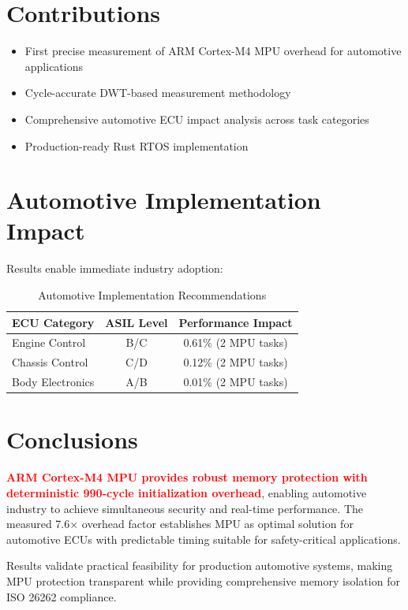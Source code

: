 \documentclass[12pt,a4paper,oneside]{report}
\newcommand{\keyresult}[1]{\textbf{\textcolor{red}{#1}}}
\begin{document}
\section{Contributions}

\begin{itemize}
    \item First precise measurement of ARM Cortex-M4 MPU overhead for automotive applications
    \item Cycle-accurate DWT-based measurement methodology
    \item Comprehensive automotive ECU impact analysis across task categories
    \item Production-ready Rust RTOS implementation
\end{itemize}

\section{Automotive Implementation Impact}

Results enable immediate industry adoption:

\begin{table}[h]
\centering
\caption{Automotive Implementation Recommendations}
\begin{tabular}{@{}lcc@{}}
\toprule
ECU Category & ASIL Level & Performance Impact \\
\midrule
Engine Control & B/C & 0.61\% (2 MPU tasks) \\
Chassis Control & C/D & 0.12\% (2 MPU tasks) \\
Body Electronics & A/B & 0.01\% (2 MPU tasks) \\
\bottomrule
\end{tabular}
\end{table}

\section{Conclusions}

\keyresult{ARM Cortex-M4 MPU provides robust memory protection with deterministic 990-cycle initialization overhead}, enabling automotive industry to achieve simultaneous security and real-time performance. The measured 7.6× overhead factor establishes MPU as optimal solution for automotive ECUs with predictable timing suitable for safety-critical applications.

Results validate practical feasibility for production automotive systems, making MPU protection transparent while providing comprehensive memory isolation for ISO 26262 compliance.

\newpage
{}
{}

\end{document}
